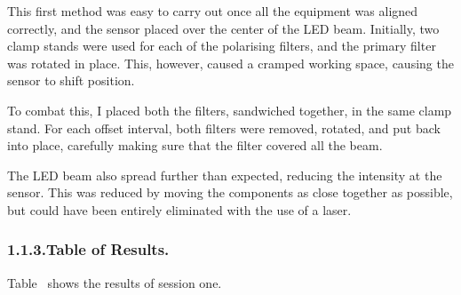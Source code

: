 \documentclass{article}
\begin{document}
\noindent{}This first method was easy to carry out once all the equipment was aligned correctly, and the sensor placed over the center of the LED beam. Initially, two clamp stands were used for each of the polarising filters, and the primary filter was rotated in place. This, however, caused a cramped working space, causing the sensor to shift position.%

To combat this, I placed both the filters, sandwiched together, in the same clamp stand. For each offset interval, both filters were removed, rotated, and put back into place, carefully making sure that the filter covered all the beam.%

The LED beam also spread further than expected, reducing the intensity at the sensor. This was reduced by moving the components as close together as possible, but could have been entirely eliminated with the use of a laser.%

\subsubsection{1.1.3.\hspace*{0.5em}Table of Results.}\label{sec-table-of-results}%

\noindent{}Table~ shows the results of session one.%
\end{document}

